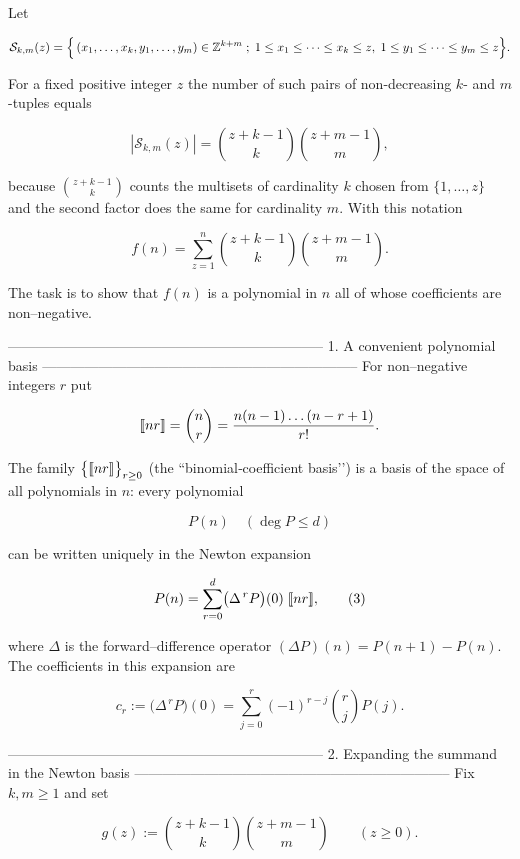 Let  

\[
\mathcal S_{k,m}(z)=\Bigl\{\,
(x_{1},\dots ,x_{k},y_{1},\dots ,y_{m})\in \Bbb Z ^{k+m}\; ;\;
1\le x_{1}\le\cdots \le x_{k}\le z,\;
1\le y_{1}\le\cdots \le y_{m}\le z\Bigr\}.
\]

For a fixed positive integer \(z\) the number of such pairs of
non-decreasing \(k\)- and \(m\)-tuples equals  

\[
|\mathcal S_{k,m}(z)|=\binom{z+k-1}{k}\binom{z+m-1}{m},
\tag{1}
\]

because \(\binom{z+k-1}{k}\) counts the multisets of cardinality \(k\)
chosen from \(\{1,\dots ,z\}\) and the second factor does the same for
cardinality \(m\).
With this notation

\[
f(n)=\sum_{z=1}^{n}\binom{z+k-1}{k}\binom{z+m-1}{m}.
\tag{2}
\]

The task is to show that \(f(n)\) is a polynomial in \(n\) all of whose
coefficients are non–negative.

--------------------------------------------------------------------
1.  A convenient polynomial basis  
--------------------------------------------------------------------
For non–negative integers \(r\) put  

\[
\llbracket n \\ r \rrbracket=\binom{n}{r}
       =\frac{n(n-1)\dots(n-r+1)}{r!}.
\]

The family \(\bigl\{\llbracket n \\ r \rrbracket\bigr\}_{r\ge 0}\) (the
“binomial‐coefficient basis’’) is a basis of the space of all
polynomials in \(n\):
every polynomial

\[
P(n)\quad(\deg P\le d)
\]

can be written uniquely in the
Newton expansion  

\[
P(n)=\sum_{r=0}^d
        \bigl(\Delta^{\,r}P\bigr)(0)\;
        \llbracket n \\ r\rrbracket ,
\tag{3}
\]

where \(\Delta\) is the forward–difference operator
\((\Delta P)(n)=P(n+1)-P(n)\).
The coefficients in this expansion are  

\[
c_r:=\bigl(\Delta^{\,r}P\bigr)(0)
     =\sum_{j=0}^{r}(-1)^{r-j}\binom{r}{j}P(j).
\tag{4}
\]

--------------------------------------------------------------------
2.  Expanding the summand in the Newton basis  
--------------------------------------------------------------------
Fix \(k,m\ge 1\) and set  

\[
g(z):=\binom{z+k-1}{k}\binom{z+m-1}{m}\qquad(z\ge 0).
\]

